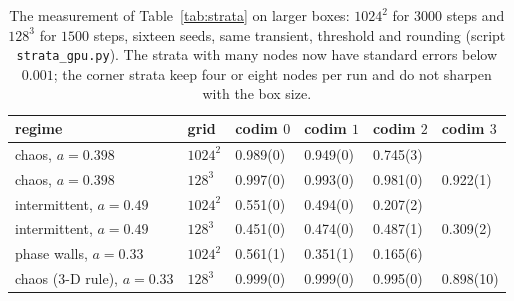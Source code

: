 \documentclass[11pt,a4paper]{article}
\theoremstyle{definition}
\theoremstyle{remark}
\begin{document}
\begin{table}[tbp]
\centering
\begin{tabular}{@{}llllll@{}}
\toprule
regime & grid & codim $0$ & codim $1$ & codim $2$ & codim $3$ \\
\midrule
chaos, $a=0.398$ & $1024^2$ & 0.989(0) & 0.949(0) & 0.745(3) & \\
chaos, $a=0.398$ & $128^3$  & 0.997(0) & 0.993(0) & 0.981(0) & 0.922(1) \\
intermittent, $a=0.49$ & $1024^2$ & 0.551(0) & 0.494(0) & 0.207(2) & \\
intermittent, $a=0.49$ & $128^3$  & 0.451(0) & 0.474(0) & 0.487(1) & 0.309(2) \\
phase walls, $a=0.33$ & $1024^2$ & 0.561(1) & 0.351(1) & 0.165(6) & \\
chaos (3-D rule), $a=0.33$ & $128^3$ & 0.999(0) & 0.999(0) & 0.995(0) & 0.898(10) \\
\bottomrule
\end{tabular}
\caption{The measurement of Table~\ref{tab:strata} on larger boxes:
$1024^2$ for $3000$ steps and $128^3$ for $1500$ steps, sixteen seeds,
same transient, threshold and rounding (script \texttt{strata\_gpu.py}).
The strata with many nodes now have standard errors below $0.001$; the
corner strata keep four or eight nodes per run and do not sharpen with
the box size.}
\label{tab:strata_big}
\end{table}
\end{document}

